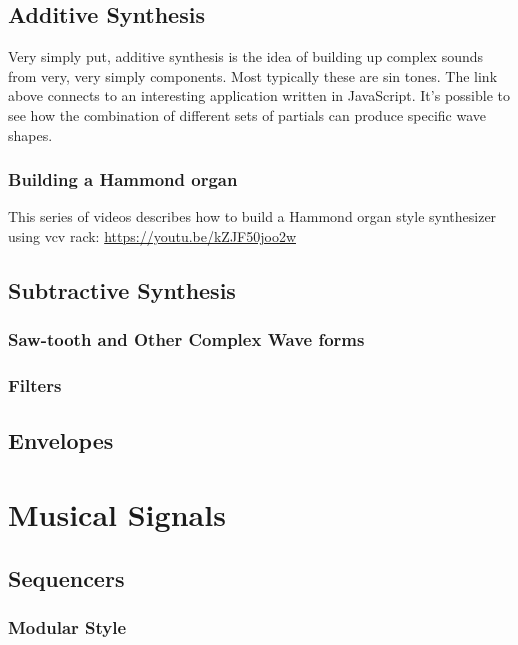 \documentclass[11pt]{article}
\begin{document}
\subsection{Additive Synthesis}
\label{sec:org57d12c4}
Very simply put, additive synthesis is the idea of building up complex
sounds from very, very simply components. Most typically these are sin
tones. The link above connects to an interesting application written
in JavaScript. It's possible to see how the combination of different
sets of partials can produce specific wave shapes. 

\subsubsection{Building a Hammond organ}
\label{sec:orgbb25ca9}
This series of videos describes how to build a Hammond organ style
synthesizer using vcv rack: \url{https://youtu.be/kZJF50joo2w}



\subsection{Subtractive Synthesis}
\label{sec:org1b5b522}
\subsubsection{Saw-tooth and Other Complex Wave forms}
\label{sec:org1c3434b}
\subsubsection{Filters}
\label{sec:orgcd68dca}

\subsection{Envelopes}
\label{sec:orgb27594d}


\section{Musical Signals}
\label{sec:orgaaa55c9}
\subsection{Sequencers}
\label{sec:org86db769}
\subsubsection{Modular Style}
\label{sec:org0497573}
\end{document}
